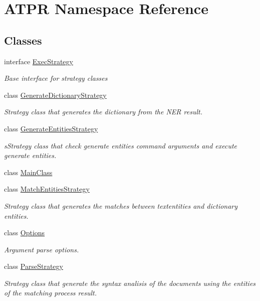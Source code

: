 \hypertarget{namespace_a_t_p_r}{}\section{A\+T\+PR Namespace Reference}
\label{namespace_a_t_p_r}
\subsection*{Classes}
\begin{DoxyCompactItemize}
\item 
interface \hyperlink{interface_a_t_p_r_1_1_exec_strategy}{Exec\+Strategy}
\begin{DoxyCompactList}\small\item\em Base interface for strategy classes \end{DoxyCompactList}\item 
class \hyperlink{class_a_t_p_r_1_1_generate_dictionary_strategy}{Generate\+Dictionary\+Strategy}
\begin{DoxyCompactList}\small\item\em Strategy class that generates the dictionary from the N\+ER result. \end{DoxyCompactList}\item 
class \hyperlink{class_a_t_p_r_1_1_generate_entities_strategy}{Generate\+Entities\+Strategy}
\begin{DoxyCompactList}\small\item\em s\+Strategy class that check generate entities command arguments and execute generate entities. \end{DoxyCompactList}\item 
class \hyperlink{class_a_t_p_r_1_1_main_class}{Main\+Class}
\item 
class \hyperlink{class_a_t_p_r_1_1_match_entities_strategy}{Match\+Entities\+Strategy}
\begin{DoxyCompactList}\small\item\em Strategy class that generates the matches between textentities and dictionary entities. \end{DoxyCompactList}\item 
class \hyperlink{class_a_t_p_r_1_1_options}{Options}
\begin{DoxyCompactList}\small\item\em Argument parse options. \end{DoxyCompactList}\item 
class \hyperlink{class_a_t_p_r_1_1_parse_strategy}{Parse\+Strategy}
\begin{DoxyCompactList}\small\item\em Strategy class that generate the syntax analisis of the documents using the entities of the matching process result. \end{DoxyCompactList}\end{DoxyCompactItemize}
